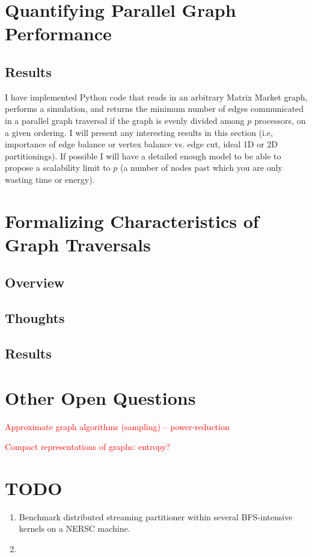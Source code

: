\documentclass[11pt]{article}
\newcommand\warning[1]{\textcolor{red}{#1}}
\begin{document}



\newpage \section{Quantifying Parallel Graph Performance}
\subsection{Results}
I have implemented Python code that reads in an arbitrary Matrix Market graph, performs a simulation, and returns the minimum number of edges communicated in a parallel graph traversal if the graph is evenly divided among $p$ processors, on a given ordering. I will present any interesting results in this section (i.e, importance of edge balance or vertex balance vs. edge cut, ideal 1D or 2D partitionings). If possible I will have a detailed enough model to be able to propose a scalability limit to $p$ (a number of nodes past which you are only wasting time or energy).


\newpage \section{Formalizing Characteristics of Graph Traversals}
\subsection{Overview}

\subsection{Thoughts}

\subsection{Results}


\newpage \section{Other Open Questions}

\warning{Approximate graph algorithms (sampling) -- power-reduction}

\warning{Compact representations of graphs: entropy?}


\newpage \section{TODO}
\begin{enumerate}
\item Benchmark distributed streaming partitioner within several BFS-intensive kernels on a NERSC machine.
\item
\end{enumerate}




\end{document}

